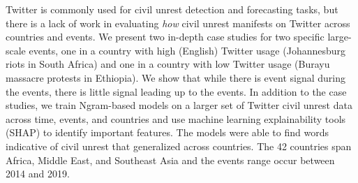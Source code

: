 Twitter is commonly used for civil unrest detection and forecasting tasks, but there is a lack of work in evaluating \textit{how} civil unrest manifests on Twitter across countries and events. We present two in-depth case studies for two specific large-scale events, one in a country with high (English) Twitter usage (Johannesburg riots in South Africa) and one in a country with low Twitter usage (Burayu massacre protests in Ethiopia). We show that while there is event signal during the events, there is little signal leading up to the events. In addition to the case studies, we train Ngram-based models on a larger set of Twitter civil unrest data across time, events, and countries and use machine learning explainability tools (SHAP) to identify important features. The models were able to find words indicative of civil unrest that generalized across countries. The 42 countries span Africa, Middle East, and Southeast Asia and the events range occur between 2014 and 2019.
